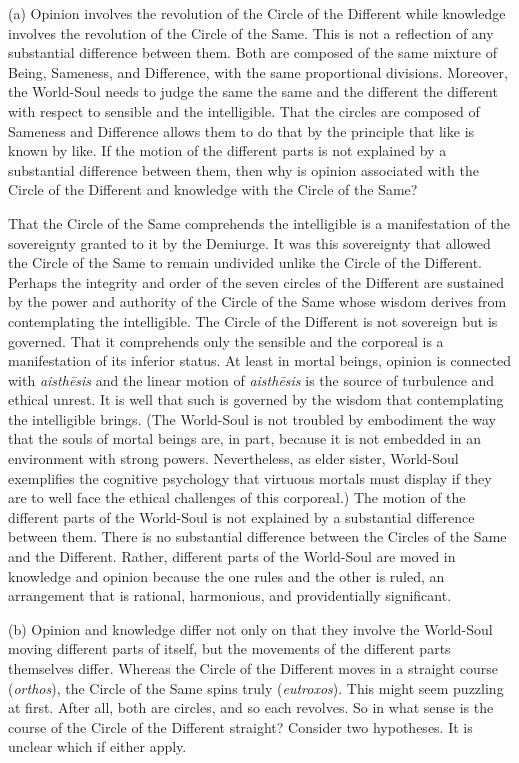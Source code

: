 (a) Opinion involves the revolution of the Circle of the Different while knowledge involves the revolution of the Circle of the Same. This is not a reflection of any substantial difference between them. Both are composed of the same mixture of Being, Sameness, and Difference, with the same proportional divisions. Moreover, the World-Soul needs to judge the same the same and the different the different with respect to sensible and the intelligible. That the circles are composed of Sameness and Difference allows them to do that by the principle that like is known by like. If the motion of the different parts is not explained by a substantial difference between them, then why is opinion associated with the Circle of the Different and knowledge with the Circle of the Same?

That the Circle of the Same comprehends the intelligible is a manifestation of the sovereignty granted to it by the Demiurge. It was this sovereignty that allowed the Circle of the Same to remain undivided unlike the Circle of the Different. Perhaps the integrity and order of the seven circles of the Different are sustained by the power and authority of the Circle of the Same whose wisdom derives from contemplating the intelligible. The Circle of the Different is not sovereign but is governed. That it comprehends only the sensible and the corporeal is a manifestation of its inferior status. At least in mortal beings, opinion is connected with \emph{aisthēsis} and the linear motion of \emph{aisthēsis} is the source of turbulence and ethical unrest. It is well that such is governed by the wisdom that contemplating the intelligible brings. (The World-Soul is not troubled by embodiment the way that the souls of mortal beings are, in part, because it is not embedded in an environment with strong powers. Nevertheless, as elder sister, World-Soul exemplifies the cognitive psychology that virtuous mortals must display if they are to well face the ethical challenges of this corporeal.) The motion of the different parts of the World-Soul is not explained by a substantial difference between them. There is no substantial difference between the Circles of the Same and the Different. Rather, different parts of the World-Soul are moved in knowledge and opinion because the one rules and the other is ruled, an arrangement that is rational, harmonious, and providentially significant.

(b) Opinion and knowledge differ not only on that they involve the World-Soul moving different parts of itself, but the movements of the different parts themselves differ. Whereas the Circle of the Different moves in a straight course (\emph{orthos}), the Circle of the Same spins truly (\emph{eutroxos}). This might seem puzzling at first. After all, both are circles, and so each revolves. So in what sense is the course of the Circle of the Different straight? Consider two hypotheses. It is unclear which if either apply.

